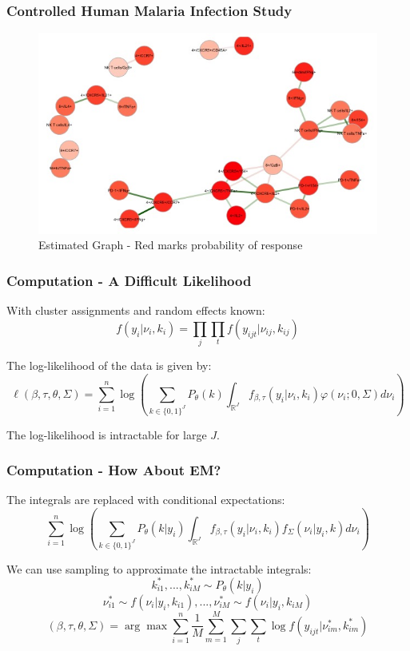 \documentclass{beamer}
\theoremstyle{definition}
\begin{document}

\begin{frame}
\frametitle{Controlled Human Malaria Infection Study}
\begin{figure}[]
\includegraphics[width=10 cm]{figures/malariaNetwork} \caption{Estimated Graph - Red marks probability of response}
\end{figure}
\end{frame}


\begin{frame}
\frametitle{Computation - A Difficult Likelihood}
With cluster assignments and random effects known:
$$
f(y_{i} | \nu_i, k_i) = \prod_{j}\prod_{t}f(y_{ijt} | \nu_{ij}, k_{ij})
$$
\vspace{0.2 cm}

\pause
The log-likelihood of the data is given by:
$$
\ell(\beta,\tau,\theta,\Sigma) = 
\sum_{i=1}^{n}\log\left(\sum_{k\in \{0,1\}^{J}} P_\theta(k) \int_{\mathbb{R}^{J}} f_{\beta,\tau}(y_i | \nu_{i}, k_i) \varphi(\nu_i;0, \Sigma) d\nu_i\right)
$$
\vspace{0.2 cm}

The log-likelihood is intractable for large $J$. 
\end{frame}


\begin{frame}
\frametitle{Computation - How About EM?}
The integrals are replaced with conditional expectations:
$$
\sum_{i=1}^{n}\log\left(\sum_{k\in \{0,1\}^{J}} P_\theta(k | y_i) \int_{\mathbb{R}^{J}} f_{\beta,\tau}(y_i | \nu_{i}, k_i) f_{\Sigma}(\nu_i| y_i, k) d\nu_i\right)
$$

\pause
\vspace{0.3 cm}
We can use sampling to approximate the intractable integrals:
$$
k_{i1}^*,...,k_{iM}^* \sim P_\theta(k|y_i)
$$$$
\nu_{i1}^* \sim f(\nu_i|y_i, k_{i1}),...,\nu_{iM}^* \sim f(\nu_i|y_i, k_{iM})
$$$$
(\beta, \tau, \theta, \Sigma) = \arg\max \sum_{i=1}^{n}\frac{1}{M}\sum_{m=1}^{M} \sum_{j} \sum_{t} \log f(y_{ijt} | \nu_{im}^{*}, k_{im}^{*})
$$
\end{frame}
\end{document}
